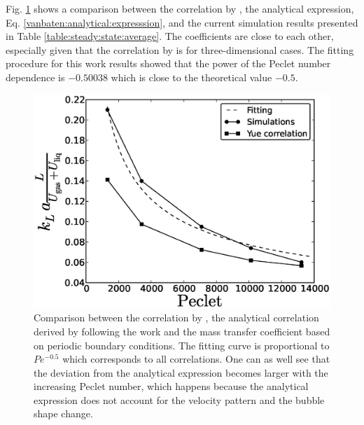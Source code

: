\documentclass{article}
\begin{document}
Fig. \ref{fig:volume:mass:coefficient} shows a comparison between the correlation by
\citet{yue-mass}, the analytical expression, Eq. \ref{vanbaten:analytical:expresssion}, and the current
simulation results presented in Table
\ref{table:steady:state:average}. The coefficients are close to each other, especially given that
the correlation by \citet{yue-mass} is for three-dimensional cases. The fitting procedure for this work results showed
that the power of
the Peclet number dependence  is $-0.50038$ which is close to the theoretical value $-0.5$. 
\begin{figure}[htb!]
\includegraphics[width=\textwidth]{Figures/correlations_comparison.eps}
\caption{Comparison between the correlation by \citet{yue-mass}, the analytical correlation derived by following the work
\cite{irandoust} and the mass transfer coefficient based
on periodic boundary conditions. The fitting curve is proportional to $Pe^{-0.5}$ which corresponds
to all correlations. One can as well see that the deviation from the analytical expression becomes
larger with the increasing Peclet number, which happens because the analytical expression does
 not account for the velocity pattern and the bubble shape change.\label{fig:volume:mass:coefficient}}
\end{figure}
\end{document}
